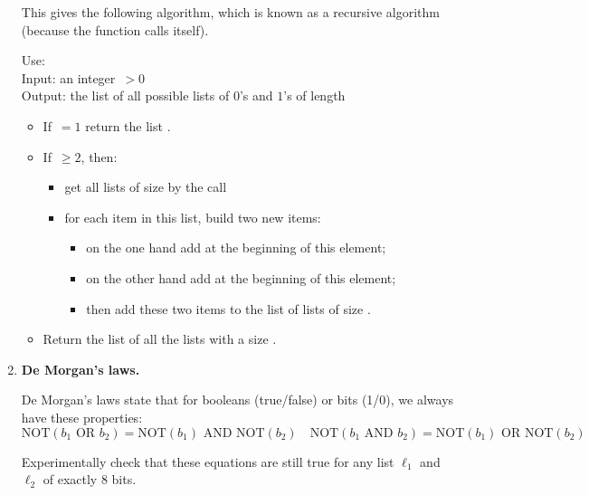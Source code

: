 \documentclass[11pt,class=report,crop=false]{standalone}
\begin{document}
\begin{activite}
\begin{enumerate}
  This gives the following algorithm, which is known as a recursive algorithm (because the function calls itself).
  \begin{algorithme}
  Use: \\
  Input: an integer \,$>0$\\
  Output: the list of all possible lists of $0$'s and $1$'s of length 

  \begin{itemize}
    \item If \,$=1$ return the list \ci{[ [0], [1] ]}.     
    \item If \,$\ge2$, then:
    \begin{itemize}
      \item get all lists of size  by the call 
      \item for each item in this list, build two new items:
       \begin{itemize} 
         \item on the one hand add  at the beginning of this element;
         \item on the other hand add  at the beginning of this element;
         \item then add these two items to the list of lists of size .
       \end{itemize}      
    \end{itemize}
    
    \item Return the list of all the lists with a size .
  \end{itemize}     
 \end{algorithme}  
  
    \item \textbf{De Morgan's laws.} 
    
    De Morgan's laws state that for booleans (true/false) or bits (1/0), we always have these properties:
    $$\text{NOT}( b_1 \text{ OR } b_2 ) = 
    \text{NOT}( b_1 )  \text{ AND } \text{NOT}(b_2)
    \quad
    \text{NOT}( b_1 \text{ AND } b_2 ) = 
    \text{NOT}( b_1 )  \text{ OR } \text{NOT}(b_2)$$
    
    Experimentally check that these equations are still true for any list $\ell_1$ and $\ell_2$ of exactly $8$ bits.
    
\end{enumerate}

\end{activite}
\end{document}
